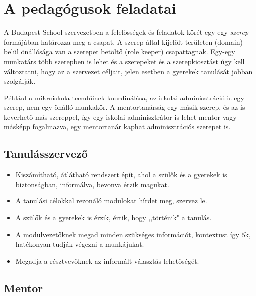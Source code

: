 \section{A pedagógusok feladatai}\label{sec:tanarfeladatok}

A Budapest School szervezetben a felelősségek és feladatok körét egy-egy \emph{szerep} formájában határozza meg a csapat. A szerep által kijelölt területen (domain) belül önállósága van a szerepet betöltő (role keeper) csapattagnak. Egy-egy munkatárs több szerepben is lehet és a szerepeket és a szerepkiosztást úgy kell változtatni, hogy az a szervezet céljait, jelen esetben a gyerekek tanulását jobban szolgálják.

Például a mikroiskola teendőinek koordinálása, az iskolai adminisztráció is egy szerep, nem egy önálló munkakör. A mentortanárság egy másik szerep, és az is keverhető más szereppel, így egy iskolai adminisztrátor is lehet mentor vagy másképp fogalmazva, egy mentortanár kaphat adminisztrációs szerepet is.



\subsection{Tanulásszervező}\label{sec:tanulasszervezo}
\begin{itemize}
    \item Kiszámítható, átlátható rendszert épít, ahol a szülők és a gyerekek is biztonságban, informálva, bevonva érzik magukat.
    \item A tanulási célokkal rezonáló modulokat hírdet meg, szervez le.
    \item A szülők és a gyerekek is érzik, értik, hogy ,,történik" a tanulás.
    \item A modulvezetőknek megad minden szükséges információt, kontextust így ők, hatékonyan tudják végezni a munkájukat.
    \item Megadja a résztvevőknek az informált választás lehetőségét.
\end{itemize}

\subsection{Mentor}\label{mentor}

